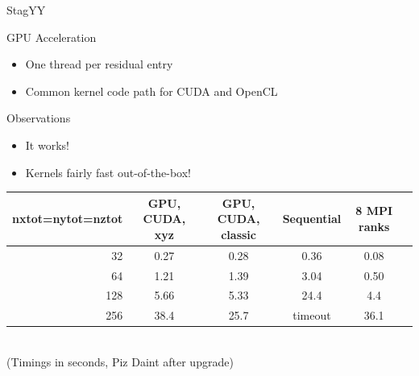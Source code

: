 \begin{frame}{StagYY}

  \begin{block}{GPU Acceleration}
  \begin{itemize}
   \item One thread per residual entry
   \item Common kernel code path for CUDA and OpenCL
  \end{itemize}
  \end{block}

  \begin{block}{Observations}
   \begin{itemize}
    \item It works!
    \item Kernels fairly fast out-of-the-box!
   \end{itemize}
  \end{block}
  
\begin{center}
\begin{tabular}{|r|c|c|c|c|c|}
 \hline
 \textbf{nxtot=nytot=nztot}   & \textbf{GPU, CUDA, xyz} & \textbf{GPU, CUDA, classic}  &\textbf{Sequential} & \textbf{8 MPI ranks}  \\
 \hline
 \hline
 32                           &  0.27 &   0.28  &     0.36    &  0.08  \\
 64                           &  1.21 &   1.39  &     3.04    &  0.50  \\
 128                          &  5.66 &   5.33  &    24.4     &  4.4  \\
 256                          &  38.4 &  25.7   &    timeout  & 36.1  \\
 \hline
\end{tabular} \\
(Timings in seconds, Piz Daint after upgrade)
\end{center}
  
\end{frame}




